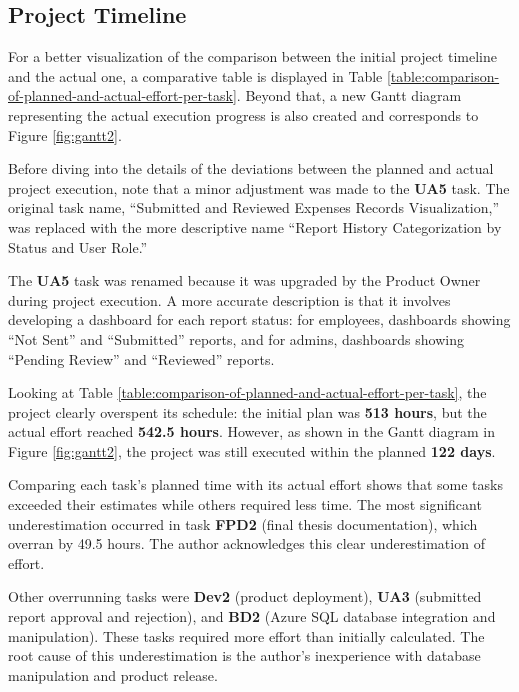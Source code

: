  \subsection{Project Timeline}
\label{actual-project-timeline}

 For a better visualization of the comparison between the initial project timeline and the actual one, a comparative table is displayed in Table \ref{table:comparison-of-planned-and-actual-effort-per-task}. Beyond that, a new Gantt diagram representing the actual execution progress is also created and corresponds to Figure \ref{fig:gantt2}. 

 
 

 Before diving into the details of the deviations between the planned and actual project execution, note that a minor adjustment was made to the \textbf{UA5} task. The original task name, “Submitted and Reviewed Expenses Records Visualization,” was replaced with the more descriptive name “Report History Categorization by Status and User Role.” 

The \textbf{UA5} task was renamed because it was upgraded by the Product Owner during project execution. A more accurate description is that it involves developing a dashboard for each report status: for employees, dashboards showing “Not Sent” and “Submitted” reports, and for admins, dashboards showing “Pending Review” and “Reviewed” reports.

Looking at Table \ref{table:comparison-of-planned-and-actual-effort-per-task}, the project clearly overspent its schedule: the initial plan was \textbf{513 hours}, but the actual effort reached \textbf{542.5 hours}. However, as shown in the Gantt diagram in Figure \ref{fig:gantt2}, the project was still executed within the planned \textbf{122 days}.

Comparing each task's planned time with its actual effort shows that some tasks exceeded their estimates while others required less time. The most significant underestimation occurred in task \textbf{FPD2} (final thesis documentation), which overran by 49.5 hours. The author acknowledges this clear underestimation of effort.

Other overrunning tasks were \textbf{Dev2} (product deployment), \textbf{UA3} (submitted report approval and rejection), and \textbf{BD2} (Azure SQL database integration and manipulation). These tasks required more effort than initially calculated. The root cause of this underestimation is the author's inexperience with database manipulation and product release.

